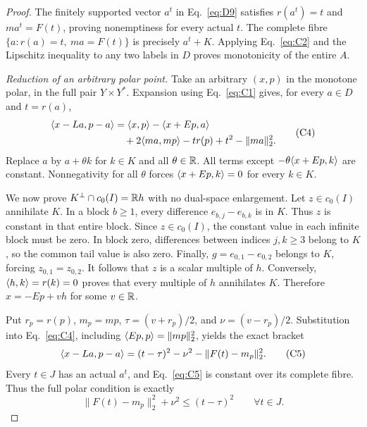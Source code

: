 \begin{proof}
The finitely supported vector $a^t$ in Eq.~\eqref{eq:D9} satisfies $r(a^t)=t$ and
$ma^t=F(t)$, proving nonemptiness for every actual $t$. The complete
fibre $\{a:r(a)=t,\ ma=F(t)\}$ is precisely $a^t+K$.
Applying Eq.~\eqref{eq:C2} and the Lipschitz inequality to any two labels
in $D$ proves monotonicity of the entire $A$.

\noindent\textit{Reduction of an arbitrary polar point.}
\label{sec:C3}
Take an arbitrary $(x,p)$ in the monotone polar, in the full pair
$Y\times Y^*$. Expansion using Eq.~\eqref{eq:C1} gives, for every
$a\in D$ and $t=r(a)$,
\begin{equation}
\begin{aligned}
\langle x-La,p-a\rangle
 &=\langle x,p\rangle-\langle x+Ep,a\rangle\\
 &\quad+2\langle ma,mp\rangle-t r(p)+t^2-\|ma\|_2^2.
\end{aligned}
\tag{C4}\label{eq:C4}
\end{equation}
Replace $a$ by $a+\theta k$ for $k\in K$ and all $\theta\in\mathbb R$.
All terms except $-\theta\langle x+Ep,k\rangle$ are constant.
Nonnegativity for all $\theta$ forces $\langle x+Ep,k\rangle=0$ for every $k\in K$.

We now prove $K^\perp\cap c_0(I)=\mathbb R h$ with no dual-space enlargement.
Let $z\in c_0(I)$ annihilate $K$. In a block $b\ge1$, every
difference $e_{b,j}-e_{b,k}$ is in $K$. Thus $z$ is constant in that
entire block. Since $z\in c_0(I)$, the constant value in each infinite
block must be zero. In block
zero, differences between indices $j,k\ge3$ belong to $K$, so the common
tail value is also zero. Finally, $g=e_{0,1}-e_{0,2}$ belongs to $K$,
forcing $z_{0,1}=z_{0,2}$. It follows that $z$ is a scalar multiple of
$h$. Conversely, $\langle h,k\rangle=r(k)=0$ proves that every multiple of $h$
annihilates $K$. Therefore $x=-Ep+vh$ for some $v\in\mathbb R$.

Put $r_p=r(p)$, $m_p=mp$, $\tau=(v+r_p)/2$, and $\nu=(v-r_p)/2$.
Substitution into Eq.~\eqref{eq:C4}, including
$\langle Ep,p\rangle=\|mp\|_2^2$, yields the exact bracket
\begin{equation}
\langle x-La,p-a\rangle
 =(t-\tau)^2-\nu^2-\|F(t)-m_p\|_2^2.
\tag{C5}\label{eq:C5}
\end{equation}
Every $t\in J$ has an actual $a^t$, and Eq.~\eqref{eq:C5} is constant
over its complete fibre. Thus the full polar condition is exactly
\begin{equation}
\|F(t)-m_p\|_2^2+\nu^2\le(t-\tau)^2
\qquad\forall t\in J.
\tag{C6}\label{eq:C6}
\end{equation}


\end{proof}

